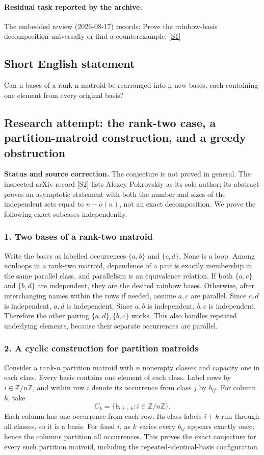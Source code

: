 \documentclass[11pt,a4paper]{article}
\newcommand{\sref}[2]{\hyperlink{source:#1:#2}{[S#2]}}
\begin{document}
\paragraph{Residual task reported by the archive.}

The embedded review (2026-08-17) records: Prove the rainbow-basis decomposition universally or find a counterexample. \sref{1457}{1}

\subsection{Short English statement}

Can n bases of a rank-n matroid be rearranged into n new bases, each containing one element from every original basis?

\subsection{Research attempt: the rank-two case, a partition-matroid construction, and a greedy obstruction}
\textbf{Status and source correction.} The conjecture is not proved in general. The inspected arXiv record [S2] lists Alexey Pokrovskiy as its sole author; its abstract proves an asymptotic statement with both the number and sizes of the independent sets equal to $n-o(n)$, not an exact decomposition. We prove the following exact subcases independently.

\subsubsection{1. Two bases of a rank-two matroid}
Write the bases as labelled occurrences $\{a,b\}$ and $\{c,d\}$. None is a loop. Among nonloops in a rank-two matroid, dependence of a pair is exactly membership in the same parallel class, and parallelism is an equivalence relation. If both $\{a,c\}$ and $\{b,d\}$ are independent, they are the desired rainbow bases. Otherwise, after interchanging names within the rows if needed, assume $a,c$ are parallel. Since $c,d$ is independent, $a,d$ is independent. Since $a,b$ is independent, $b,c$ is independent. Therefore the other pairing $\{a,d\},\{b,c\}$ works. This also handles repeated underlying elements, because their separate occurrences are parallel.

\subsubsection{2. A cyclic construction for partition matroids}
Consider a rank-$n$ partition matroid with $n$ nonempty classes and capacity one in each class. Every basis contains one element of each class. Label rows by $i\in\mathbb Z/n\mathbb Z$, and within row $i$ denote its occurrence from class $j$ by $b_{ij}$. For column $k$, take
\[C_k=\{b_{i,i+k}:i\in\mathbb Z/n\mathbb Z\}.
\]
Each column has one occurrence from each row. Its class labels $i+k$ run through all classes, so it is a basis. For fixed $i$, as $k$ varies every $b_{ij}$ appears exactly once; hence the columns partition all occurrences. This proves the exact conjecture for every such partition matroid, including the repeated-identical-basis configuration.
\end{document}
